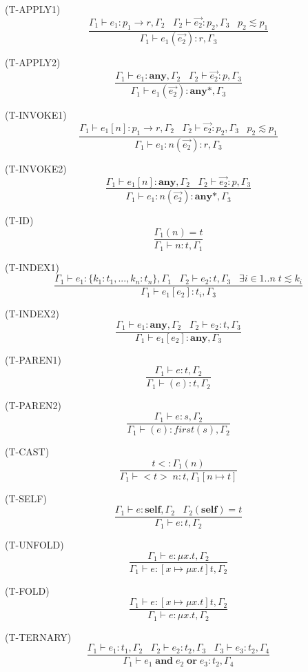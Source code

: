 \documentclass{paper}
\newcommand{\Any}{\mathbf{any}}
\newcommand{\Self}{\mathbf{self}}
\newcommand{\mylabel}[1]{\; (\textsc{#1})}
\newcommand{\env}{\Gamma}
\newcommand{\subtype}{<:}
\begin{document}
\mylabel{T-APPLY1}
\[
\dfrac{\env_{1} \vdash e_{1}:p_{1} \rightarrow r, \env_{2} \;\;\;
       \env_{2} \vdash \vec{e_{2}}:p_{2}, \env_{3} \;\;\;
       p_{2} \lesssim p_{1}}
      {\env_{1} \vdash e_{1}(\vec{e_{2}}):r, \env_{3}}
\]

\mylabel{T-APPLY2}
\[
\dfrac{\env_{1} \vdash e_{1}:\Any, \env_{2} \;\;\;
       \env_{2} \vdash \vec{e_{2}}:p, \env_{3}}
      {\env_{1} \vdash e_{1}(\vec{e_{2}}):\Any{*}, \env_{3}}
\]

\mylabel{T-INVOKE1}
\[
\dfrac{\env_{1} \vdash e_{1}[n]:p_{1} \rightarrow r, \env_{2} \;\;\;
       \env_{2} \vdash \vec{e_{2}}:p_{2}, \env_{3} \;\;\;
       p_{2} \lesssim p_{1}}
      {\env_{1} \vdash e_{1}{:}n(\vec{e_{2}}):r, \env_{3}}
\]

\mylabel{T-INVOKE2}
\[
\dfrac{\env_{1} \vdash e_{1}[n]:\Any, \env_{2} \;\;\;
       \env_{2} \vdash \vec{e_{2}}:p, \env_{3}}
      {\env_{1} \vdash e_{1}{:}n(\vec{e_{2}}):\Any{*}, \env_{3}}
\]

\mylabel{T-ID}
\[
\dfrac{\env_{1}(n) = t}
      {\env_{1} \vdash n:t, \env_{1}}
\]

\mylabel{T-INDEX1}
\[
\dfrac{\env_{1} \vdash e_{1}:\{k_{1}{:}t_{1}, ..., k_{n}{:}t_{n}\}, \env_{1} \;\;\;
       \env_{2} \vdash e_{2}:t, \env_{3} \;\;\;
       \exists i \in 1{..}n \; t \lesssim k_{i}}
      {\env_{1} \vdash e_{1}[e_{2}]:t_{i}, \env_{3}}
\]

\mylabel{T-INDEX2}
\[
\dfrac{\env_{1} \vdash e_{1}:\Any, \env_{2} \;\;\;
       \env_{2} \vdash e_{2}:t, \env_{3}}
      {\env_{1} \vdash e_{1}[e_{2}]:\Any, \env_{3}}
\]

\mylabel{T-PAREN1}
\[
\dfrac{\env_{1} \vdash e:t, \env_{2}}
      {\env_{1} \vdash (e):t, \env_{2}}
\]

\mylabel{T-PAREN2}
\[
\dfrac{\env_{1} \vdash e:s, \env_{2}}
      {\env_{1} \vdash (e):first(s), \env_{2}}
\]

\mylabel{T-CAST}
\[
\dfrac{t \subtype \env_{1}(n)}
      {\env_{1} \vdash {<}t{>} \; n:t, \env_{1}[n \mapsto t]}
\]

\mylabel{T-SELF}
\[
\dfrac{\env_{1} \vdash e:\Self, \env_{2} \;\;\;
       \env_{2}(\Self) = t}
      {\env_{1} \vdash e:t, \env_{2}}
\]

\mylabel{T-UNFOLD}
\[
\dfrac{\env_{1} \vdash e:\mu x.t, \env_{2}}
      {\env_{1} \vdash e:[x \mapsto \mu x.t]t, \env_{2}}
\]

\mylabel{T-FOLD}
\[
\dfrac{\env_{1} \vdash e:[x \mapsto \mu x.t]t, \env_{2}}
      {\env_{1} \vdash e:\mu x.t, \env_{2}}
\]

\mylabel{T-TERNARY}
\[
\dfrac{\env_{1} \vdash e_{1}:t_{1}, \env_{2} \;\;\;
       \env_{2} \vdash e_{2}:t_{2}, \env_{3} \;\;\;
       \env_{3} \vdash e_{3}:t_{2}, \env_{4}}
      {\env_{1} \vdash e_{1} \; \mathbf{and} \; e_{2} \; \mathbf{or} \; e_{3}:t_{2}, \env_{4}}
\]
\end{document}
